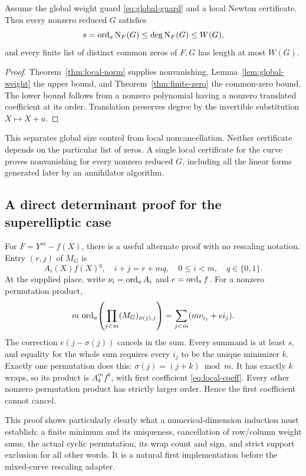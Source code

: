 \begin{corollary}\label{cor:two-certificates}
Assume the global weight guard \eqref{eq:global-guard} and a local Newton certificate. Then every nonzero reduced $G$ satisfies
\[
 s=\operatorname{ord}_a\operatorname{N}_F(G)\le\deg\operatorname{N}_F(G)\le W(G),
\]
and every finite list of distinct common zeros of $F,G$ has length at most $W(G)$.
\end{corollary}
\begin{proof}
Theorem~\ref{thm:local-norm} supplies nonvanishing, Lemma~\ref{lem:global-weight} the upper bound, and Theorem~\ref{thm:finite-zero} the common-zero bound. The lower bound follows from a nonzero polynomial having a nonzero translated coefficient at its order. Translation preserves degree by the invertible substitution $X\mapsto X+a$.
\end{proof}

This separates global size control from local noncancellation. Neither certificate depends on the particular list of zeros. A single local certificate for the curve proves nonvanishing for every nonzero reduced $G$, including all the linear forms generated later by an annihilator algorithm.

\subsection{A direct determinant proof for the superelliptic case}

For $F=Y^m-f(X)$, there is a useful alternate proof with no rescaling notation. Entry $(r,j)$ of $M_G$ is
\[
 A_i(X)f(X)^q,
 \quad i+j=r+mq,\quad 0\le i<m,\quad q\in\{0,1\}.
\]
At the supplied place, write $\nu_i=\operatorname{ord}_a A_i$ and $e=\operatorname{ord}_a f$. For a nonzero permutation product,
\[
 m\,\operatorname{ord}_a\!\left(\prod_{j<m}(M_G)_{\sigma(j),j}\right)
 =\sum_{j<m}(m\nu_{i_j}+ei_j).
\]
The correction $e(j-\sigma(j))$ cancels in the sum. Every summand is at least $s$, and equality for the whole sum requires every $i_j$ to be the unique minimizer $k$. Exactly one permutation does this: $\sigma(j)=(j+k)\bmod m$. It has exactly $k$ wraps, so its product is $A_k^mf^k$, with first coefficient \eqref{eq:local-coeff}. Every other nonzero permutation product has strictly larger order. Hence the first coefficient cannot cancel.

This proof shows particularly clearly what a numerical-dimension induction must establish: a finite minimum and its uniqueness, cancellation of row/column weight sums, the actual cyclic permutation, its wrap count and sign, and strict support exclusion for all other words. It is a natural first implementation before the mixed-curve rescaling adapter.

